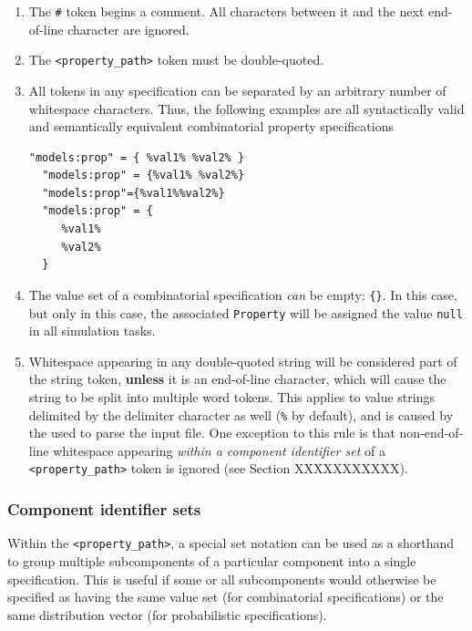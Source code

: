 \documentclass{article}
\begin{document}
\begin{enumerate}

\item The {\tt \#} token begins a comment. All characters between it and the next end-of-line character are ignored.

\item The {\tt <property\_path>} token must be double-quoted.

\item All tokens in any specification can be separated by an arbitrary number of whitespace characters. Thus, the following examples are all syntactically valid and semantically equivalent combinatorial property specifications

\begin{lstlisting}[]
  "models:prop" = { %val1% %val2% }
  "models:prop" = {%val1% %val2%}
  "models:prop"={%val1%%val2%}
  "models:prop" = {
     %val1%
     %val2%
  }
\end{lstlisting}

\item The value set of a combinatorial specification \textit{can} be empty: {\tt \{\}}. In this case, but only in this case, the associated {\tt Property} will be assigned the value {\tt null} in all simulation tasks.

\item Whitespace appearing in any double-quoted string will be considered part of the string token, \textbf{unless} it is an end-of-line character, which will cause the string to be split into multiple word tokens. This applies to value strings delimited by the delimiter character as well ({\tt \%} by default), and is caused by the  used to parse the input file. One exception to this rule is that non-end-of-line whitespace appearing \textit{within a component identifier set} of a {\tt <property\_path>} token is ignored (see Section XXXXXXXXXXX).

\end{enumerate}

\subsubsection{Component identifier sets}

Within the {\tt <property\_path>}, a special set notation can be used as a shorthand to group multiple subcomponents of a particular component into a single specification. This is useful if some or all subcomponents would otherwise be specified as having the same value set (for combinatorial specifications) or the same distribution vector (for probabilistic specifications).
\end{document}
